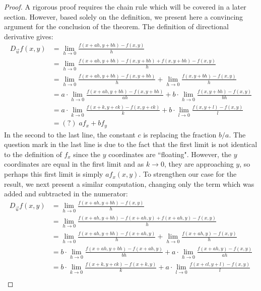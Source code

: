 \documentclass[handout]{ximera}
\begin{document}
\begin{proof}
A rigorous proof requires the chain rule which will be covered in a later section. 
However, based solely on the definition, we present here a convincing argument for the conclusion of the theorem. 
The definition of directional derivative gives:
\begin{align*}
D_{\vec u} f(x,y) &= \lim_{h \to 0} \frac{f(x + ah, y + bh) -f(x,y)}{h} \\
                  &= \lim_{h \to 0} \frac{f(x + ah, y + bh) - f(x , y+ bh) + f(x, y+bh) -f(x,y)}{h} \\
                  &= \lim_{h \to 0} \frac{f(x + ah, y + bh) - f(x , y+ bh)}{h} + \lim_{h \to 0} \frac{f(x , y+ bh) -f(x,y)}{h} \\
                  &= a\cdot \lim_{h \to 0} \frac{f(x + ah, y + bh) - f(x , y+ bh)}{ah} + b\cdot \lim_{h \to 0} \frac{f(x , y+ bh) -f(x,y)}{bh} \\
                  &= a\cdot \lim_{k \to 0} \frac{f(x + k, y + ck) - f(x , y+ ck)}{k} + b\cdot \lim_{l \to 0} \frac{f(x , y+ l) -f(x,y)}{l} \\
                  &= (?) \; a f_x + bf_y
\end{align*}
In the second to the last line, the constant $c$ is replacing the fraction $b/a$.  
The question mark in the last line is due to the fact that the first limit is not
identical to the definition of $f_x$ since the $y$ coordinates are ``floating".  
However, the $y$ coordinates are equal in the first limit and as $k \to 0$, they are approaching $y$, 
so perhaps this first limit is simply $af_x(x,y)$. 
To strengthen our case for the result, we next present a similar computation, 
changing only the term which was added and subtracted in the numerator:
\begin{align*}
D_{\vec u} f(x,y) &= \lim_{h \to 0} \frac{f(x + ah, y + bh) -f(x,y)}{h} \\
                  &= \lim_{h \to 0} \frac{f(x + ah, y + bh) - f(x+ah , y) + f(x+ah, y) -f(x,y)}{h} \\
                  &= \lim_{h \to 0} \frac{f(x + ah, y + bh) - f(x+ah, y)}{h} + \lim_{h \to 0} \frac{f(x+ah , y) -f(x,y)}{h} \\
                  &= b\cdot \lim_{h \to 0} \frac{f(x + ah, y + bh) - f(x+ah , y)}{bh} + a\cdot \lim_{h \to 0} \frac{f(x+ah , y) -f(x,y)}{ah} \\
                  &= b\cdot \lim_{k \to 0} \frac{f(x + k, y + ck) - f(x+k , y)}{k} + a\cdot \lim_{l \to 0} \frac{f(x+ cl , y+ l) -f(x,y)}{l} \\

\end{align*}
\end{proof}
\end{document}
